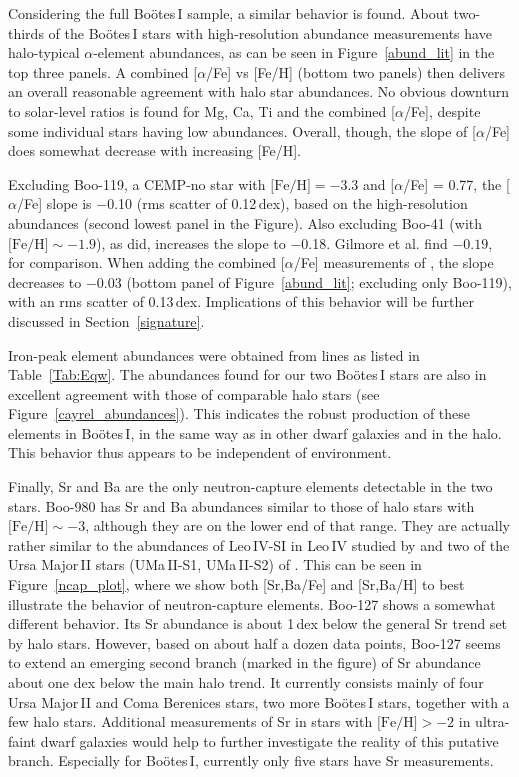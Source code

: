 \documentclass[]{emulateapj}
\begin{document}
Considering the full Bo\"otes\,I sample, a similar behavior is
found. About two-thirds of the Bo\"otes\,I stars with high-resolution
abundance measurements have halo-typical $\alpha$-element abundances,
as can be seen in Figure~\ref{abund_lit} in the top three panels. A
combined [$\alpha$/Fe] vs [Fe/H] (bottom two panels) then delivers an
overall reasonable agreement with halo star abundances. No obvious
downturn to solar-level ratios is found for Mg, Ca, Ti and the
combined [$\alpha$/Fe], despite some individual stars having low
abundances. Overall, though, the slope of [$\alpha$/Fe] does somewhat
decrease with increasing [Fe/H]. 

Excluding Boo-119, a CEMP-no star with $\mbox{[Fe/H]} =-3.3$
and [$\alpha$/Fe] = 0.77, the [$\alpha$/Fe] slope is $-$0.10 (rms
scatter of 0.12\,dex), based on the high-resolution abundances (second
lowest panel in the Figure). Also excluding Boo-41 (with
$\mbox{[Fe/H]} \sim -1.9$), as \citet{gilmore13} did, increases the
slope to $-$0.18. Gilmore et al. find $-0.19$, for comparison. When
adding the combined [$\alpha$/Fe] measurements of \citet{lai11}, the
slope decreases to $-$0.03 (bottom panel of Figure~\ref{abund_lit};
excluding only Boo-119), with an rms scatter of 0.13\,dex.
Implications of this behavior will be further discussed in
Section~\ref{signature}.



Iron-peak element abundances were obtained from lines as
listed in Table~\ref{Tab:Eqw}. The abundances found for our two
Bo\"otes\,I stars are also in excellent agreement with those of
comparable halo stars (see Figure~\ref{cayrel_abundances}). This
indicates the robust production of these elements in Bo\"otes\,I, in
the same way as in other dwarf galaxies and in the halo. This behavior
thus appears to be independent of environment.


Finally, Sr and Ba are the only neutron-capture elements detectable in
the two stars. Boo-980 has Sr and Ba abundances similar to those of
halo stars with $\mbox{[Fe/H]} \sim -3$, although they are on the
lower end of that range. They are actually rather similar to the
abundances of Leo\,IV-SI in Leo\,IV studied by \citet{leo4} and two of
the Ursa Major\,II stars (UMa\,II-S1, UMa\,II-S2) of
\citet{frebel10}. This can be seen in Figure~\ref{ncap_plot}, where we
show both [Sr,Ba/Fe] and [Sr,Ba/H] to best illustrate the behavior of
neutron-capture elements.  Boo-127 shows a somewhat different
behavior. Its Sr abundance is about 1\,dex below the general Sr trend
set by halo stars. However, based on about half a dozen data points,
Boo-127 seems to extend an emerging second branch (marked in the
figure) of Sr abundance about one dex below the main halo trend. It
currently consists mainly of four Ursa Major\,II and Coma Berenices
stars, two more Bo\"otes\,I stars, together with a few halo
stars. Additional measurements of Sr in stars with $\mbox{[Fe/H]} >-2$
in ultra-faint dwarf galaxies would help to further investigate the
reality of this putative branch. Especially for Bo\"otes\,I, currently
only five stars have Sr measurements.
\end{document}
